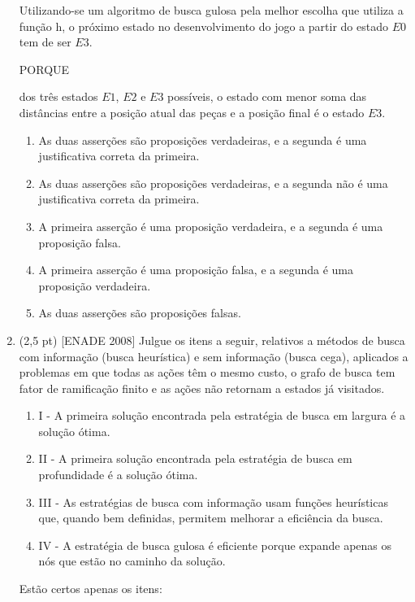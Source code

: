 \documentclass[12pt,a4paper,oneside]{article}
\begin{document}
\begin{enumerate}
	Utilizando-se um algoritmo de busca gulosa pela melhor escolha que utiliza a função h, o próximo estado no desenvolvimento do jogo a partir do estado $E0$ tem de ser $E3$.
	
	\begin{center}
		PORQUE
	\end{center}
	
	dos três estados $E1$, $E2$ e $E3$ possíveis, o estado com menor soma das distâncias entre a posição atual das peças e a posição final é o estado $E3$.
	
	\begin{enumerate}
		\item As duas asserções são proposições verdadeiras, e a segunda é uma justificativa correta da primeira.
		\item As duas asserções são proposições verdadeiras, e a segunda não é uma justificativa correta da primeira.
		\item A primeira asserção é uma proposição verdadeira, e a segunda é uma proposição falsa.
		\item A primeira asserção é uma proposição falsa, e a segunda é uma proposição verdadeira.
		\item As duas asserções são proposições falsas.
	\end{enumerate}	
	
	\item (2,5 pt) [ENADE 2008] Julgue os itens a seguir, relativos a métodos de busca com informação (busca heurística) e sem informação (busca cega), aplicados a problemas em que todas as ações têm o mesmo custo, o grafo de busca tem fator de ramificação finito e as ações não retornam a estados já visitados.
	
	\begin{enumerate}
		\item[] I - A primeira solução encontrada pela estratégia de busca em largura é a solução ótima. 
		\item[] II - A primeira solução encontrada pela estratégia de busca em profundidade é a solução ótima.
		\item[] III - As estratégias de busca com informação usam funções heurísticas que, quando bem definidas, permitem
		melhorar a eficiência da busca.
		\item[] IV - A estratégia de busca gulosa é eficiente porque expande apenas os nós que estão no caminho da
		solução.
	\end{enumerate}
	
	Estão certos apenas os itens:
	

\end{enumerate}
\end{document}
